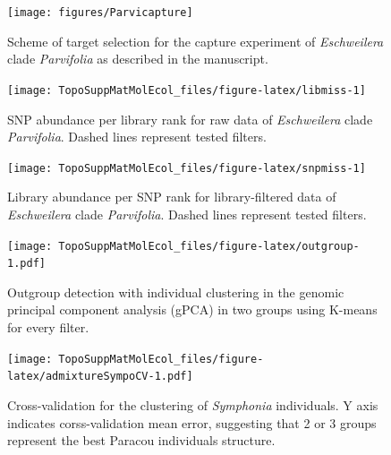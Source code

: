 \documentclass[12pt,]{article}
\begin{document}
\newpage

\begin{figure}[H]

{\centering \texttt{[image: figures/Parvicapture]} 

}

\caption{Scheme of target selection for the capture experiment of \emph{Eschweilera} clade \emph{Parvifolia} as described in the manuscript.}\label{fig:parvicapture}
\end{figure}

\newpage

\begin{figure}[H]

{\centering \texttt{[image: TopoSuppMatMolEcol\_files/figure-latex/libmiss-1]} 

}

\caption{SNP abundance per library rank for raw data of \emph{Eschweilera} clade \emph{Parvifolia}. Dashed lines represent tested filters.}\label{fig:libmiss}
\end{figure}

\newpage

\begin{figure}[H]

{\centering \texttt{[image: TopoSuppMatMolEcol\_files/figure-latex/snpmiss-1]} 

}

\caption{Library abundance per SNP rank for library-filtered data of \emph{Eschweilera} clade \emph{Parvifolia}. Dashed lines represent tested filters.}\label{fig:snpmiss}
\end{figure}

\newpage

\begin{figure}
\centering
\texttt{[image: TopoSuppMatMolEcol\_files/figure-latex/outgroup-1.pdf]}
\caption{\label{fig:outgroup}Outgroup detection with individual clustering in the genomic principal component analysis (gPCA) in two groups using K-means for every filter.}
\end{figure}

\newpage

\begin{figure}
\centering
\texttt{[image: TopoSuppMatMolEcol\_files/figure-latex/admixtureSympoCV-1.pdf]}
\caption{\label{fig:admixtureSympoCV}Cross-validation for the clustering of \emph{Symphonia} individuals. Y axis indicates corss-validation mean error, suggesting that 2 or 3 groups represent the best Paracou individuals structure.}
\end{figure}
\end{document}
